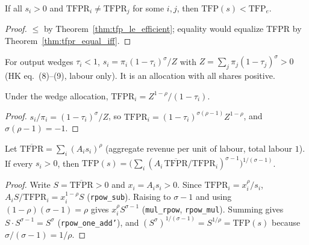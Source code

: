 \begin{corollary}
\label{cor:tfp_lt_of_dispersion}
\leanok
{}
If all $s_i > 0$ and $\mathrm{TFPR}_i \neq \mathrm{TFPR}_j$ for some $i, j$, then $\mathrm{TFP}(s) < \mathrm{TFP}_e$.
\end{corollary}
\begin{proof}
\leanok
$\le$ by Theorem~\ref{thm:tfp_le_efficient}; equality would equalize TFPR by Theorem~\ref{thm:tfpr_equal_iff}.
\end{proof}

\begin{definition}
\label{def:wedgeAlloc}
\leanok
{}
For output wedges $\tau_i < 1$, $s_i = \pi_i(1-\tau_i)^\sigma / Z$ with $Z = \sum_j \pi_j (1-\tau_j)^\sigma > 0$
(HK eq.~(8)--(9), labour only). It is an allocation with all shares positive.
\end{definition}

\begin{theorem}
\label{thm:tfpr_wedgeAlloc}
\leanok
{}
Under the wedge allocation, $\mathrm{TFPR}_i = Z^{1-\rho}/(1-\tau_i)$.
\end{theorem}
\begin{proof}
\leanok
$s_i/\pi_i = (1-\tau_i)^\sigma/Z$, so $\mathrm{TFPR}_i = (1-\tau_i)^{\sigma(\rho-1)} Z^{1-\rho}$, and
$\sigma(\rho - 1) = -1$.
\end{proof}

\begin{theorem}
\label{thm:tfp_eq_hk}
\leanok
{}
Let $\overline{\mathrm{TFPR}} = \sum_i (A_is_i)^\rho$ (aggregate revenue per unit of labour, total labour $1$).
If every $s_i > 0$, then
$\mathrm{TFP}(s) = \bigl(\sum_i (A_i\,\overline{\mathrm{TFPR}}/\mathrm{TFPR}_i)^{\sigma-1}\bigr)^{1/(\sigma-1)}$.
\end{theorem}
\begin{proof}
\leanok
Write $S = \overline{\mathrm{TFPR}} > 0$ and $x_i = A_is_i > 0$. Since $\mathrm{TFPR}_i = x_i^\rho/s_i$,
$A_iS/\mathrm{TFPR}_i = x_i^{1-\rho}S$ (\texttt{rpow\_sub}). Raising to $\sigma - 1$ and using
$(1-\rho)(\sigma-1) = \rho$ gives $x_i^\rho S^{\sigma-1}$ (\texttt{mul\_rpow}, \texttt{rpow\_mul}). Summing gives
$S\cdot S^{\sigma-1} = S^\sigma$ (\texttt{rpow\_one\_add'}), and $(S^\sigma)^{1/(\sigma-1)} = S^{1/\rho} = \mathrm{TFP}(s)$
because $\sigma/(\sigma-1) = 1/\rho$.
\end{proof}

